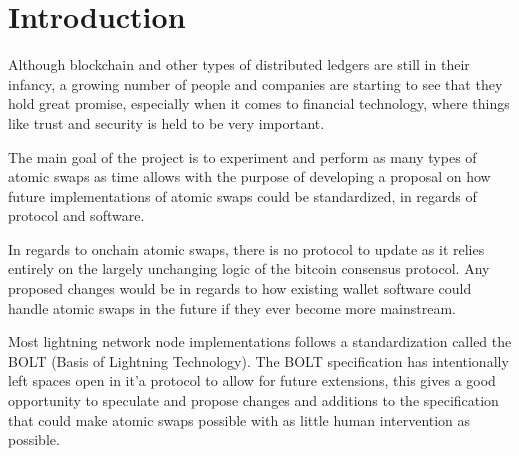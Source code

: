 
\chapter{Introduction}
Although blockchain and other types of distributed ledgers are still in their
infancy, a growing number of people and companies are starting to see that they
hold great promise, especially when it comes to financial technology, where
things like trust and security is held to be very important.







The main goal of the project is to experiment and perform as many types of atomic swaps as time allows with the purpose of developing a proposal on how future implementations of atomic swaps could be standardized, in regards of protocol and software.

In regards to onchain atomic swaps, there is no protocol to update as it relies entirely on the largely unchanging logic of the bitcoin consensus protocol. Any proposed changes would be in regards to how existing wallet software could handle atomic swaps in the future if they ever become more mainstream.

Most lightning network node implementations follows a standardization called the BOLT (Basis of Lightning Technology). The BOLT specification has intentionally left spaces open in it'a protocol to allow for future extensions, this gives a good opportunity to speculate and propose changes and additions to the specification that could make atomic swaps possible with as little human intervention as possible.